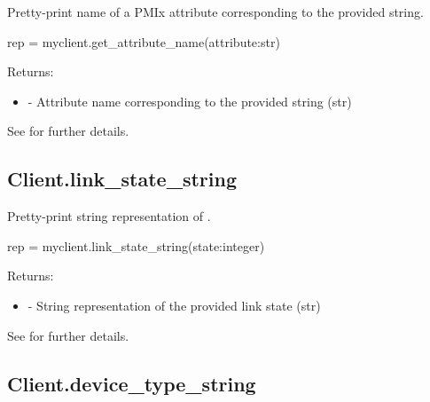 \summary

Pretty-print name of a \ac{PMIx} attribute corresponding to the provided string.

\format

\pyspecificstart
\begin{codepar}
rep = myclient.get_attribute_name(attribute:str)
\end{codepar}
\pyspecificend

\begin{arglist}
\end{arglist}

Returns:
\begin{itemize}
    \item {} - Attribute name corresponding to the provided string (str)
\end{itemize}

See  for further details.


\subsection{Client.link_state_string}

\summary

Pretty-print string representation of .

\format

\pyspecificstart
\begin{codepar}
rep = myclient.link_state_string(state:integer)
\end{codepar}
\pyspecificend

\begin{arglist}
\end{arglist}

Returns:
\begin{itemize}
    \item {} - String representation of the provided link state (str)
\end{itemize}

See  for further details.



\subsection{Client.device_type_string}

